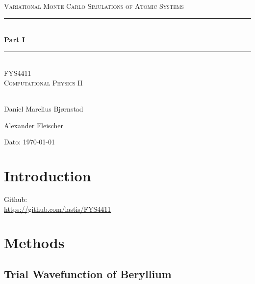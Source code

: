 \documentclass[twocolumn]{article}[10pt]
\title{}
\begin{document}
\begin{titlepage}
\begin{center}

\textsc{\Large Variational Monte Carlo Simulations of
Atomic Systems}\\[0.5cm]
\rule{\linewidth}{0.5mm} \\[0.4cm]
{ \huge \bfseries  Part I}\\[0.10cm]
\rule{\linewidth}{0.5mm} \\[1.5cm]
\textsc{\Large FYS4411}\\
\textsc{\Large Computational Physics II}\\[1.5cm]
\textsc{}\\[1.5cm]

\begin{minipage}{0.49\textwidth}
    \begin{center} \large
		Daniel Marelius Bj\o rnstad
    \end{center}
\end{minipage}
\begin{minipage}{0.49\textwidth}
    \begin{center} \large
        Alexander Fleischer
    \end{center}
\end{minipage}

\vfill

\large{Dato: \today}

\end{center}
\end{titlepage}

\maketitle

\section{Introduction}
Github: \\ \url{https://github.com/lastis/FYS4411}

\section{Methods}
\subsection{Trial Wavefunction of Beryllium}
\end{document}
